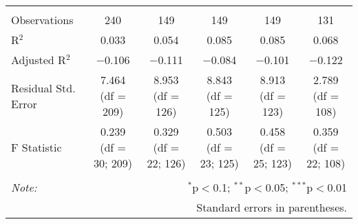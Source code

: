 \begin{tabular}{@{\extracolsep{5pt}}lccccc}
\hline \\[-1.8ex] 
Observations & 240 & 149 & 149 & 149 & 131 \\ 
R$^{2}$ & 0.033 & 0.054 & 0.085 & 0.085 & 0.068 \\ 
Adjusted R$^{2}$ & $-$0.106 & $-$0.111 & $-$0.084 & $-$0.101 & $-$0.122 \\ 
Residual Std. Error & 7.464 (df = 209) & 8.953 (df = 126) & 8.843 (df = 125) & 8.913 (df = 123) & 2.789 (df = 108) \\ 
F Statistic & 0.239 (df = 30; 209) & 0.329 (df = 22; 126) & 0.503 (df = 23; 125) & 0.458 (df = 25; 123) & 0.359 (df = 22; 108) \\ 
\hline 
\hline \\[-1.8ex] 
\textit{Note:}  & \multicolumn{5}{r}{$^{*}$p$<$0.1; $^{**}$p$<$0.05; $^{***}$p$<$0.01} \\ 
 & \multicolumn{5}{r}{Standard errors in parentheses.} \\ 
\end{tabular} 
\endgroup 
